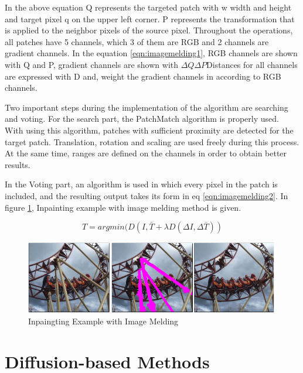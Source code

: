 In the above equation Q represents the targeted patch with w width and height and target pixel q on the upper left corner. P represents the transformation that is applied to the neighbor pixels of the source pixel. Throughout the operations, all patches have 5 channels, which 3 of them are RGB and 2 channels are gradient channels. In the equation \ref{eqn:imagemelding1}, RGB channels are shown with Q and P, gradient channels are shown with \(\Delta Q \Delta P \)Distances for all channels are expressed with D and,  weight the gradient channels in according to RGB channels.

Two important steps during the implementation of the algorithm are searching and voting. For the search part, the PatchMatch algorithm is properly used. With using this algorithm, patches with sufficient proximity are detected for the target patch. Translation, rotation and scaling are used freely during this process. At the same time, ranges are defined on the channels in order to obtain better results.

In the Voting part, an algorithm is used in which every pixel in the patch is included, and the resulting output takes its form in eq \ref{eqn:imagemelding2}. In figure \ref{fig:inpainting-image-melding}, Inpainting example with image melding method is given.

\begin{equation}
    \label{eqn:imagemelding2}
    T= argmin(D(I,\bar{T}+\lambda D(\Delta I,\Delta \bar{T}))
\end{equation}

\begin{figure}[h]
    \centering
    \includegraphics{figures/chapter2/ImageMeldingExample.png}
    \caption{Inpaingting Example with Image Melding}
    \label{fig:inpainting-image-melding}
\end{figure}

\section{Diffusion-based Methods}

